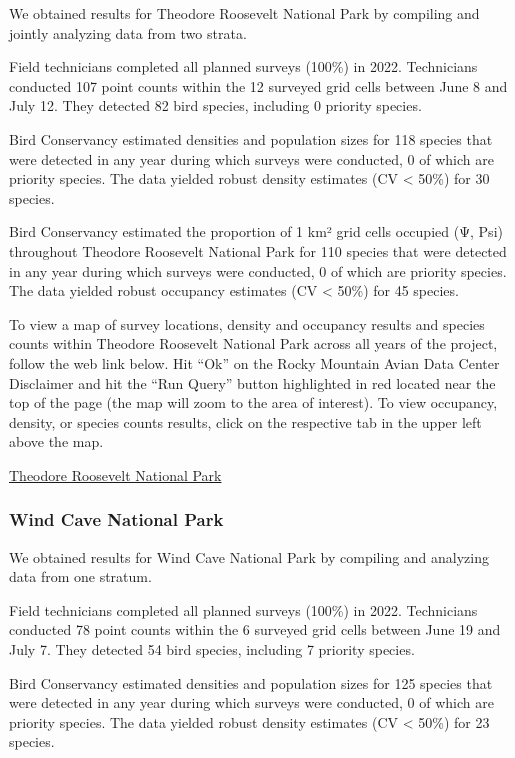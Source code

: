 \documentclass[
  letterpaper,
  DIV=11,
  numbers=noendperiod,
  oneside]{scrreprt}
\begin{document}
We obtained results for Theodore Roosevelt National Park by compiling
and jointly analyzing data from two strata.

Field technicians completed all planned surveys (100\%) in 2022.
Technicians conducted 107 point counts within the 12 surveyed grid cells
between June 8 and July 12. They detected 82 bird species, including 0
priority species.

Bird Conservancy estimated densities and population sizes for 118
species that were detected in any year during which surveys were
conducted, 0 of which are priority species. The data yielded robust
density estimates (CV \textless{} 50\%) for 30 species.

Bird Conservancy estimated the proportion of 1 km² grid cells occupied
(Ψ, Psi) throughout Theodore Roosevelt National Park for 110 species
that were detected in any year during which surveys were conducted, 0 of
which are priority species. The data yielded robust occupancy estimates
(CV \textless{} 50\%) for 45 species.

To view a map of survey locations, density and occupancy results and
species counts within Theodore Roosevelt National Park across all years
of the project, follow the web link below. Hit ``Ok'' on the Rocky
Mountain Avian Data Center Disclaimer and hit the ``Run Query'' button
highlighted in red located near the top of the page (the map will zoom
to the area of interest). To view occupancy, density, or species counts
results, click on the respective tab in the upper left above the map.

\href{http://www.rmbo.org/new_site/adc/QueryWindow.aspx\#N4IgzgrgDgpgTmALnAhoiBbEAuABCAFQAsYB7AE1LhlwCVTSwYA3GAG0VwDk0BLUgHYo2uAAoo4AaxABfIA=}{Theodore
Roosevelt National Park}

\hypertarget{wind-cave-national-park}{%
\subsubsection{Wind Cave National Park}\label{wind-cave-national-park}}

We obtained results for Wind Cave National Park by compiling and
analyzing data from one stratum.

Field technicians completed all planned surveys (100\%) in 2022.
Technicians conducted 78 point counts within the 6 surveyed grid cells
between June 19 and July 7. They detected 54 bird species, including 7
priority species.

Bird Conservancy estimated densities and population sizes for 125
species that were detected in any year during which surveys were
conducted, 0 of which are priority species. The data yielded robust
density estimates (CV \textless{} 50\%) for 23 species.
\end{document}
